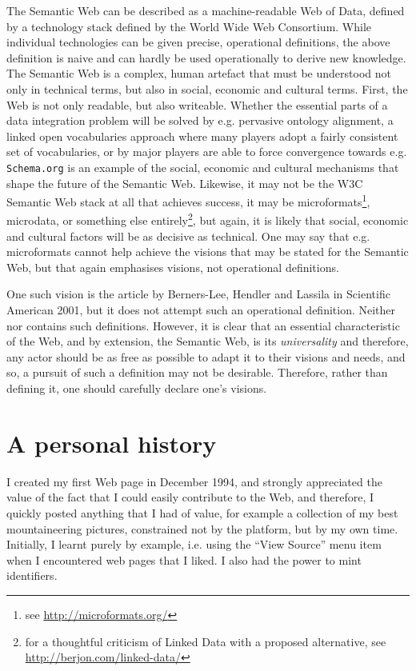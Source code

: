 The Semantic Web can be described as a machine-readable Web of Data,
defined by a technology stack defined by the World Wide Web
Consortium. While individual technologies can be given precise,
operational definitions, the above definition is naive and can hardly
be used operationally to derive new knowledge. The Semantic Web is a
complex, human artefact that must be understood not only in technical
terms, but also in social, economic and cultural terms. First, the Web
is not only readable, but also writeable. Whether the essential parts
of a data integration problem will be solved by e.g. pervasive
ontology alignment, a linked open vocabularies approach where many
players adopt a fairly consistent set of vocabularies, or by major
players are able to force convergence towards e.g. \texttt{Schema.org}
is an example of the social, economic and cultural mechanisms that
shape the future of the Semantic Web. Likewise, it may not be the W3C
Semantic Web stack at all that achieves success, it may be
microformats\footnote{see \url{http://microformats.org/}},
microdata\cite{microdata}, or something else entirely\footnote{for a
  thoughtful criticism of Linked Data with a proposed alternative, see
  \url{http://berjon.com/linked-data/}}, but again, it is likely that
social, economic and cultural factors will be as decisive as
technical. One may say that e.g. microformats cannot help achieve the
visions that may be stated for the Semantic Web, but that again
emphasises visions, not operational definitions.

One such vision is the article by Berners-Lee, Hendler and Lassila in
Scientific American 2001\cite{berners2001semantic}, but it does not attempt such an
operational definition. Neither \cite{semwebroadmap} nor \cite{berners2000weaving} contains
such definitions. However, it is clear that an essential
characteristic of the Web, and by extension, the Semantic Web, is its
\emph{universality} and therefore, any actor should be as free as
possible to adapt it to their visions and needs, and so, a pursuit of
such a definition may not be desirable. Therefore, rather than
defining it, one should carefully declare one's visions.

\section{A personal history}\label{sec:history}

I created my first Web page in December 1994, and strongly appreciated
the value of the fact that I could easily contribute to the Web, and
therefore, I quickly posted anything that I had of value, for example
a collection of my best mountaineering pictures, constrained not by
the platform, but by my own time. Initially, I learnt purely by
example, i.e. using the ``View Source'' menu item when I encountered
web pages that I liked. I also had the power to mint identifiers. 

